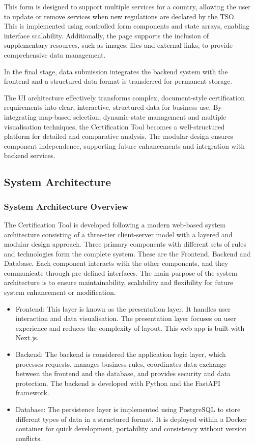 This form is designed to support multiple services for a country, allowing the user to update or remove services when new regulations are declared by the TSO. This is implemented using controlled form components and state arrays, enabling interface scalability. Additionally, the page supports the inclusion of supplementary resources, such as images, files and external links, to provide comprehensive data management.

In the final stage, data submission integrates the backend system with the frontend and a structured data format is transferred for permanent storage.

The UI architecture effectively transforms complex, document-style certification requirements into clear, interactive, structured data for business use. By integrating map-based selection, dynamic state management and multiple visualisation techniques, the Certification Tool becomes a well-structured platform for detailed and comparative analysis. The modular design ensures component independence, supporting future enhancements and integration with backend services.

\subsection{System Architecture}

\subsubsection{System Architecture Overview}
The Certification Tool is developed following a modern web-based system architecture consisting of a three-tier client-server model with a layered and modular design approach. Three primary components with different sets of rules and technologies form the complete system. These are the Frontend, Backend and Database. Each component interacts with the other components, and they communicate through pre-defined interfaces. The main purpose of the system architecture is to ensure maintainability, scalability and flexibility for future system enhancement or modification.

\begin{itemize}
    \item Frontend: This layer is known as the presentation layer. It handles user interaction and data visualisation. The presentation layer focuses on user experience and reduces the complexity of layout. This web app is built with Next.js.
    \item Backend: The backend is considered the application logic layer, which processes requests, manages business rules, coordinates data exchange between the frontend and the database, and provides security and data protection. The backend is developed with Python and the FastAPI framework.
    \item Database: The persistence layer is implemented using PostgreSQL to store different types of data in a structured format. It is deployed within a Docker container for quick development, portability and consistency without version conflicts.
\end{itemize}

